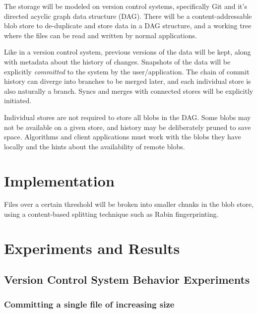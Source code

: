 \documentclass[12pt,a4paper,two-side]{book}
\newcommand{\newterm}{\textit}
\begin{document}
The storage will be modeled on version control systems, specifically Git and
it's directed acyclic graph data structure (DAG). There will be a
content-addressable blob store to de-duplicate and store data in a DAG
structure, and a working tree where the files can be read and written by normal
applications.

Like in a version control system, previous versions of the data will be kept,
along with metadata about the history of changes. Snapshots of the data will be
explicitly \newterm{committed} to the system by the user/application. The chain
of commit history can diverge into branches to be merged later, and each
individual store is also naturally a branch. Syncs and merges with connected
stores will be explicitly initiated.

Individual stores are not required to store all blobs in the DAG. Some blobs may
not be available on a given store, and history may be deliberately pruned to
save space. Algorithms and client applications must work with the blobs they
have locally and the hints about the availability of remote blobs.









\chapter{Implementation}


Files over a certain threshold will be broken into smaller chunks in the blob
store, using a content-based splitting technique such as Rabin fingerprinting.









\chapter{Experiments and Results}

\section{Version Control System Behavior Experiments}

\subsection{Committing a single file of increasing size}
\end{document}
